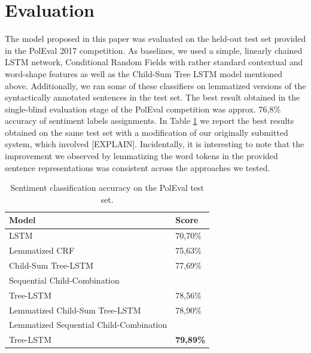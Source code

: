 \documentclass[10pt, a4paper]{article}
\begin{document}
\section{Evaluation} 
	The model proposed in this paper was evaluated on the held-out test set provided in the PolEval 2017 competition. As baselines, we used a simple, linearly chained LSTM network, Conditional Random Fields \cite{lafferty2001conditional} with rather standard contextual and word-shape features as well as the Child-Sum Tree LSTM model mentioned above. Additionally, we ran some of these classifiers on lemmatized versions of the syntactically annotated sentences in the test set. The best result obtained in the single-blind evaluation stage of the PolEval competition was 
approx. 76,8\% accuracy of sentiment labels assignments.  In Table \ref{tab:evaluation} we report the best results obtained on the same test set with a modification of our originally submitted system, which involved [EXPLAIN]. Incidentally, it is interesting to note that the improvement we observed by lemmatizing the word tokens in the provided sentence representations was consistent across the approaches we tested.
\begin{table}[h]
 \begin{center}
\begin{tabular}{|l|l|}

      \hline
      Model & Score\\
      \hline
      \hline
      LSTM &70,70\%\\
      \hline
      Lemmatized CRF & 75,63\%\\
      \hline
      Child-Sum Tree-LSTM &  77,69\%\\
      \hline
      Sequential Child-Combination & \\
      Tree-LSTM & 78,56\%\\
      \hline
      Lemmatized Child-Sum Tree-LSTM & 78,90\%\\
      \hline
      Lemmatized Sequential Child-Combination & \\
      Tree-LSTM & \textbf{79,89\%} \\
      \hline
\end{tabular}
\caption{Sentiment classification accuracy on the PolEval test set.}
\label{tab:evaluation}
 \end{center}
\end{table}
\end{document}
